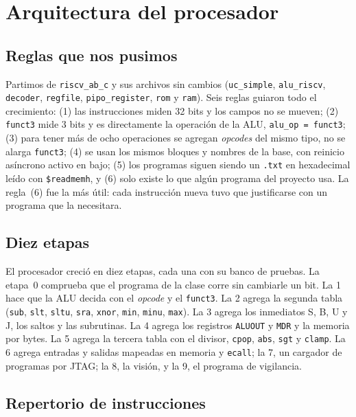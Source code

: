 \documentclass[conference,letterpaper,10pt]{IEEEtran}
\newcommand{\sig}[1]{{\small\texttt{#1}}}
\begin{document}
\section{Arquitectura del procesador}
\label{sec:arq}

\subsection{Reglas que nos pusimos}

Partimos de \sig{riscv\_ab\_c} y sus archivos sin cambios (\sig{uc\_simple}, \sig{alu\_riscv}, \sig{decoder}, \sig{regfile},
\sig{pipo\_register}, \sig{rom} y \sig{ram}). Seis reglas guiaron todo el crecimiento: (1) las instrucciones miden 32 bits y los
campos no se mueven; (2) \sig{funct3} mide 3 bits y es directamente la operación de la ALU, \sig{alu\_op = funct3}; (3) para
tener más de ocho operaciones se agregan \emph{opcodes} del mismo tipo, no se alarga \sig{funct3}; (4) se usan los mismos bloques
y nombres de la base, con reinicio asíncrono activo en bajo; (5) los programas siguen siendo un \sig{.txt} en hexadecimal leído con
\sig{\$readmemh}, y (6) solo existe lo que algún programa del proyecto usa. La regla~(6) fue la más útil: cada instrucción nueva
tuvo que justificarse con un programa que la necesitara.

\subsection{Diez etapas}

El procesador creció en diez etapas, cada una con su banco de pruebas. La etapa~0 comprueba que el programa de la clase corre
sin cambiarle un bit. La 1 hace que la ALU decida con el \emph{opcode} y el \sig{funct3}. La 2 agrega la segunda tabla
(\sig{sub}, \sig{slt}, \sig{sltu}, \sig{sra}, \sig{xnor}, \sig{min}, \sig{minu}, \sig{max}). La 3 agrega los inmediatos S, B, U
y J, los saltos y las subrutinas. La 4 agrega los registros \sig{ALUOUT} y \sig{MDR} y la memoria por bytes. La 5 agrega la
tercera tabla con el divisor, \sig{cpop}, \sig{abs}, \sig{sgt} y \sig{clamp}. La 6 agrega entradas y salidas mapeadas en
memoria y \sig{ecall}; la 7, un cargador de programas por JTAG; la 8, la visión, y la 9, el programa de vigilancia.

\subsection{Repertorio de instrucciones}
\end{document}
